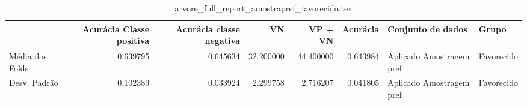 \begin{table}
\centering
\caption{arvore_full_report_amostrapref_favorecido.tex}
\label{arvore_full_report_amostrapref_favorecido.tex}
\begin{tabular}{lrrrrrll}
\toprule
{} &  Acurácia Classe positiva &  Acurácia classe negativa &        VN  &   VP + VN  &  Acurácia &         Conjunto de dados &       Grupo \\
\midrule
Média dos Folds &                  0.639795 &                  0.645634 &  32.200000 &  44.400000 &  0.643984 &  Aplicado Amostragem pref &  Favorecido \\
Desv. Padrão    &                  0.102389 &                  0.033924 &   2.299758 &   2.716207 &  0.041805 &  Aplicado Amostragem pref &  Favorecido \\
\bottomrule
\end{tabular}
\end{table}
